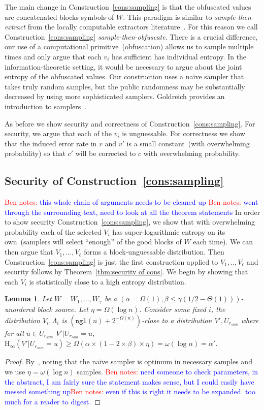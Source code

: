 \documentclass[11pt]{article}
\newcommand{\thref}[1]{\mbox{Theorem~\ref{#1}}}
\newcommand{\consref}[1]{\mbox{Construction~\ref{#1}}}
\newcommand{\ngl}{\ensuremath{\mathtt{ngl}}\xspace}
\newcommand{\Hoo}{\mathrm{H}_\infty}
\newtheorem{lemma}[theorem]{Lemma}
\newcommand{\authnote}[2]{{\textcolor{red}{\textsf{#1 notes: }\textcolor{blue}{ #2}}\marginpar{\textcolor{red}{\textbf{!!!!!}}}}}
\newcommand{\authnote}[2]{}
\newcommand{\bnote}[1]{{\authnote{Ben}{#1}}}
\begin{document}
The main change in \consref{cons:sampling} is that the obfuscated values are concatenated blocks symbols of $W$.  This paradigm is similar to \emph{sample-then-extract} from the locally computable extractors literature~\cite{lu2002hyper,vadhan2003constructing}.  For this reason we call \consref{cons:sampling} \emph{sample-then-obfuscate}.  There is a crucial difference, our use of a computational primitive~(obfuscation) allows us to sample multiple times and only argue that each $v_i$ has sufficient has individual entropy.  In the information-theoretic setting, it would be necessary to argue about the joint entropy of the obfuscated values.  Our construction uses a na\"{i}ve sampler that takes truly random samples, but the public randomness may be substantially decreased by using more sophisticated samplers.  Goldreich provides an introduction to samplers~\cite{goldreich1997sample}.

As before we show security and correctness of \consref{cons:sampling}.  For security, we argue that each of the $v_i$ is unguessable.  For correctness we show that the induced error rate in $v$ and $v'$ is a small constant~(with overwhelming probability) so that $c'$ will be corrected to $c$ with overwhelming probability.

\subsection{Security of \consref{cons:sampling}}
\bnote{this whole chain of arguments needs to be cleaned up}
\bnote{went through the surrounding text, need to look at all the theorem statements}
In order to show security \consref{cons:sampling}, we show that with overwhelming probability each of the selected $V_i$ has super-logarithmic entropy on its own~(samplers will select ``enough'' of the good blocks of $W$ each time).  We can then argue that $V_1,..., V_\ell$ forms a block-unguessable distribution.  Then \consref{cons:sampling} is just the first construction applied to $V_1,.., V_\ell$ and security follows by \thref{thm:security of cons}.  We begin by showing that each $V_i$ is statistically close to a high entropy distribution.

\begin{lemma}
\label{lem:sampling works}
Let $W = W_1,..., W_\gamma$ be a $(\alpha = \Omega(1), \beta \leq \gamma(1/2-\Theta(1)))$-unordered block source.  Let $\eta = \Omega(\log n)$. Consider some fixed $i$, the distribution $V_{i}, \Lambda_i$ is $(\ngl(n)+ 2^{-\Omega(n)})$-close to a distribution $V', U_{r_{sam}}$ where for all $u\in U_{r_{sam}}$ $V' | U_{r_{sam}}=u$, $\Hoo(V' | U_{r_{sam}}=u) \geq \Omega(\alpha\times (1-2\times \beta) \times \eta) = \omega(\log n) = \alpha'$.
\end{lemma}
\begin{proof}
By~\cite[Lemma 9]{vadhan2003constructing}, noting that the na\"{i}ve sampler is optimum in necessary samples and we use $\eta = \omega(\log n)$ samples.  \bnote{need someone to check parameters, in the abstract, I am fairly sure the statement makes sense, but I could easily have messed something up}\bnote{even if this is right it needs to be expanded.  too much for a reader to digest.}
\end{proof}
\end{document}
